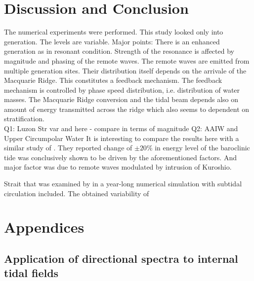 \documentclass[12pt]{article}
\begin{document}
\section{Discussion and Conclusion}
The numerical experiments were performed. This study looked only into generation. The levels are 
variable.
Major points:
There is an enhanced generation as in resonant condition. Strength of the resonance is affected by 
magnitude and phasing of the remote waves. The remote waves are emitted from multiple generation 
sites. Their distribution itself depends on the arrivale of the Macquarie Ridge. This constitutes a 
feedback mechanism. The feedback mechanism is controlled by phase speed distribution, i.e. 
distribution of water masses. The Macquarie Ridge conversion and the tidal beam depends also on 
amount of energy transmitted across the ridge which also seems to dependent on stratification.\\
Q1: Luzon Str var and here - compare in terms of magnitude
Q2: AAIW and Upper Circumpolar Water
It is interesting to compare the results here with a similar study of \citep{kerry2014impact}. They 
reported change of $\pm 20\%$ in energy level of the baroclinic tide was conclusively shown to be 
driven by the aforementioned factors. And major factor was due to remote waves modulated by 
intrusion of Kuroshio. 

Strait that was examined by  in a year-long numerical simulation with 
subtidal circulation included. The obtained variability of 

\section*{Appendices}

\renewcommand{\thesubsection}{\Alph{subsection}}
\setcounter{subsection}{0}
\subsection{Application of directional spectra to internal tidal fields}
\end{document}
